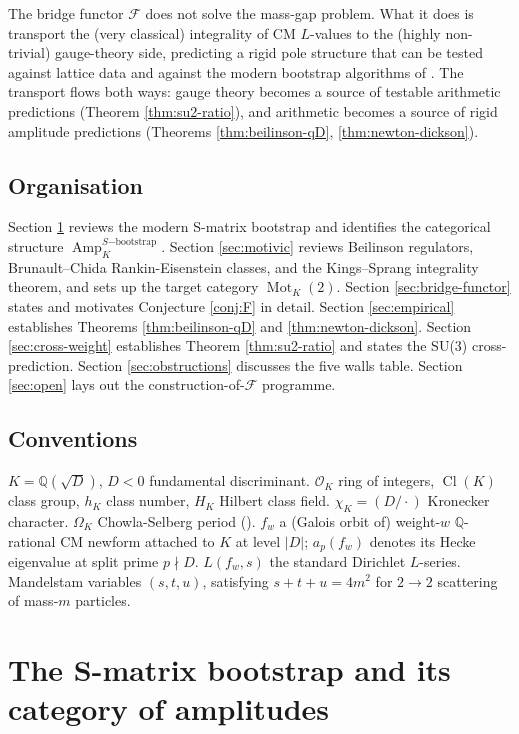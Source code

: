 \documentclass[11pt]{amsart}
\theoremstyle{definition}
\theoremstyle{remark}
\DeclareMathOperator{\Cl}{Cl}
\DeclareMathOperator{\Amp}{Amp}
\DeclareMathOperator{\Mot}{Mot}
\newcommand{\Q}{\mathbb{Q}}
\newcommand{\OK}{\mathcal{O}_K}
\newcommand{\HK}{H_K}
\newcommand{\chiK}{\chi_K}
\begin{document}
The bridge functor $\mathcal{F}$ does not solve the mass-gap problem.
What it does is transport the (very classical) integrality of CM
$L$-values to the (highly non-trivial) gauge-theory side, predicting a
rigid pole structure that can be tested against lattice data and against
the modern bootstrap algorithms of \cite{HeKruczenski23, HeKruczenski24}.
The transport flows both ways: gauge theory becomes a source of
testable arithmetic predictions (Theorem \ref{thm:su2-ratio}),
and arithmetic becomes a source of rigid amplitude predictions (Theorems
\ref{thm:beilinson-qD}, \ref{thm:newton-dickson}).

\subsection{Organisation}\label{ss:organisation}

Section \ref{sec:smatrix} reviews the modern S-matrix bootstrap and
identifies the categorical structure $\Amp_K^{S\mathrm{-bootstrap}}$.
Section \ref{sec:motivic} reviews Beilinson regulators, Brunault--Chida
Rankin-Eisenstein classes, and the Kings--Sprang integrality theorem,
and sets up the target category $\Mot_K(2)$. Section
\ref{sec:bridge-functor} states and motivates Conjecture \ref{conj:F}
in detail. Section \ref{sec:empirical} establishes Theorems
\ref{thm:beilinson-qD} and \ref{thm:newton-dickson}. Section
\ref{sec:cross-weight} establishes Theorem \ref{thm:su2-ratio} and
states the SU(3) cross-prediction.
Section \ref{sec:obstructions} discusses the five walls table.
Section \ref{sec:open} lays out the construction-of-$\mathcal{F}$
programme.

\subsection*{Conventions}
$K = \Q(\sqrt{D})$, $D < 0$ fundamental discriminant. $\OK$ ring of
integers, $\Cl(K)$ class group, $h_K$ class number, $\HK$ Hilbert class
field. $\chiK = (D/\cdot)$ Kronecker character. $\Omega_K$ Chowla-Selberg
period (\cite{ChowlaSelberg1949}). $f_w$ a (Galois orbit of) weight-$w$
$\Q$-rational CM newform attached to $K$ at level $|D|$; $a_p(f_w)$
denotes its Hecke eigenvalue at split prime $p \nmid D$. $L(f_w, s)$
the standard Dirichlet $L$-series. Mandelstam variables $(s, t, u)$,
satisfying $s + t + u = 4 m^2$ for $2 \to 2$ scattering of mass-$m$
particles.

\section{The S-matrix bootstrap and its category of amplitudes}\label{sec:smatrix}
\end{document}

